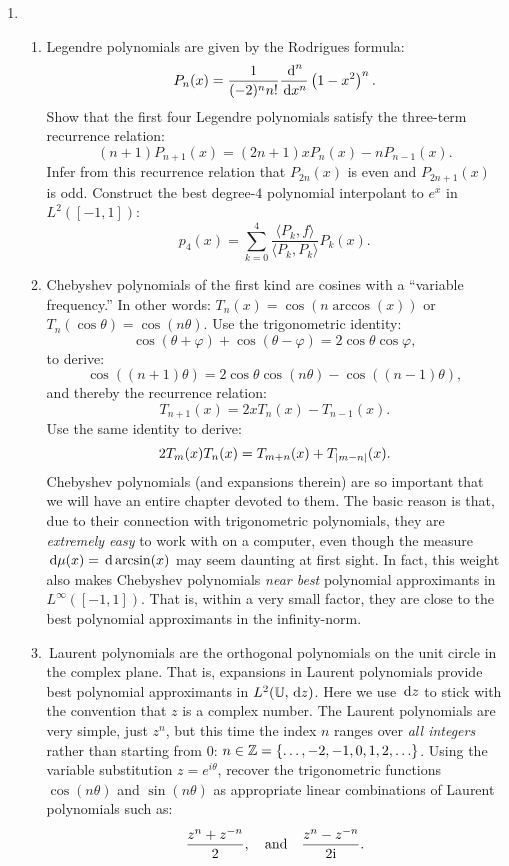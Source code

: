 \documentclass[11pt,letterpaper]{article}
\begin{document}
\begin{enumerate}
\item \begin{enumerate}
\item Legendre polynomials are given by the Rodrigues formula:
\[
P_n(x) = \dfrac{1}{(-2)^nn!}\dfrac{{\rm\,d}^n}{{\rm\,d} x^n}\left(1-x^2\right)^n.
\]
Show that the first four Legendre polynomials satisfy the three-term recurrence relation:
\[
(n+1)P_{n+1}(x) = (2n+1)xP_n(x) - nP_{n-1}(x).
\]
Infer from this recurrence relation that $P_{2n}(x)$ is even and $P_{2n+1}(x)$ is odd. Construct the best degree-$4$ polynomial interpolant to $e^x$ in $L^2([-1,1])$:
\[
p_4(x) = \sum_{k=0}^4 \dfrac{\langle P_k,f\rangle}{\langle P_k,P_k\rangle}P_k(x).
\]
\item Chebyshev polynomials of the first kind are cosines with a ``variable frequency.'' In other words: $T_n(x) = \cos(n\arccos(x))$ or $T_n(\cos\theta) = \cos(n\theta)$. Use the trigonometric identity:
\[
\cos(\theta+\varphi) + \cos(\theta-\varphi) = 2\cos\theta \cos\varphi,
\]
to derive:
\[
\cos((n+1)\theta) = 2\cos\theta \cos(n\theta) - \cos((n-1)\theta),
\]
and thereby the recurrence relation:
\[
T_{n+1}(x) = 2xT_n(x) - T_{n-1}(x).
\]
Use the same identity to derive:
\[
2T_m(x)T_n(x) = T_{m+n}(x) + T_{\left|{m-n}\right|}(x).
\]
Chebyshev polynomials (and expansions therein) are so important that we will have an entire chapter devoted to them. The basic reason is that, due to their connection with trigonometric polynomials, they are {\em extremely easy} to work with on a computer, even though the measure ${\rm\,d}\mu(x) = {\rm\,d} \arcsin(x)$ may seem daunting at first sight. In fact, this weight also makes Chebyshev polynomials {\em near best} polynomial approximants in $L^\infty([-1,1])$. That is, within a very small factor, they are close to the best polynomial approximants in the infinity-norm.
\item\, Laurent polynomials are the orthogonal polynomials on the unit circle in the complex plane. That is, expansions in Laurent polynomials provide best polynomial approximants in $L^2(\mathbb{U},{\rm\,d} z)$. Here we use ${\rm\,d} z$ to stick with the convention that $z$ is a complex number. The Laurent polynomials are very simple, just $z^n$, but this time the index $n$ ranges over {\em all integers} rather than starting from $0$: $n\in\mathbb{Z} = \{\ldots,-2,-1,0,1,2,\ldots\}$. Using the variable substitution $z = e^{i\theta}$, recover the trigonometric functions $\cos(n\theta)$ and $\sin(n\theta)$ as appropriate linear combinations of Laurent polynomials such as:
\[
\dfrac{z^{n}+z^{-n}}{2},\quad{\rm and}\quad\dfrac{z^{n}-z^{-n}}{2{\rm i}}.
\]
\end{enumerate}
\end{enumerate}
\end{document}
